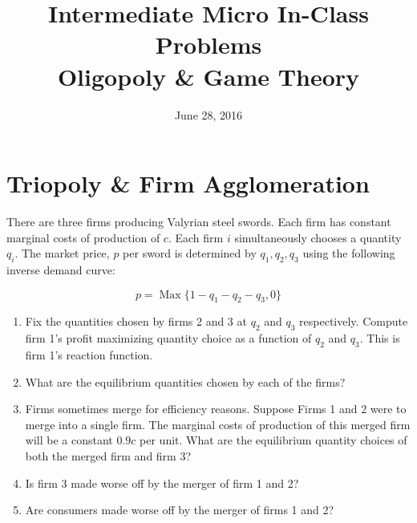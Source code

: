 \documentclass{article}
\DeclareMathOperator*{\Max}{Max}
\begin{document}
\title{Intermediate Micro In-Class Problems \\ \large Oligopoly \& Game Theory}

\date{June 28, 2016}

\maketitle

\section*{Triopoly \& Firm Agglomeration}

There are three firms producing Valyrian steel swords. Each firm has constant marginal costs of production of $c$. Each firm $i$ simultaneously chooses a quantity $q_i$. The market price, $p$ per sword is determined by $q_1, q_2, q_3$ using the following inverse demand curve:

\[ p = \Max \{1 - q_1-q_2-q_3, 0\} \]

\begin{enumerate}
\item Fix the quantities chosen by firms 2 and 3 at $q_2$ and $q_3$ respectively. Compute firm 1's profit maximizing quantity choice as a function of $q_2$ and $q_3$. This is firm 1's reaction function.
\item What are the equilibrium quantities chosen by each of the firms?
\item Firms sometimes merge for efficiency reasons. Suppose Firms 1 and 2 were to merge into a single firm. The marginal costs of production of this merged firm will be a constant $0.9c$ per unit. What are the equilibrium quantity choices of both the merged firm and firm 3?
\item Is firm 3 made worse off by the merger of firm 1 and 2?
\item Are consumers made worse off by the merger of firms 1 and 2?
\end{enumerate}
\end{document}
